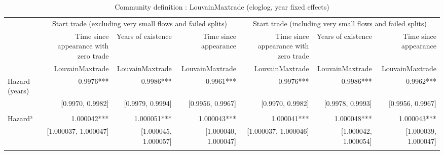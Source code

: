 \begin{table}[!h]
\caption{Community definition : LouvainMaxtrade (cloglog, year fixed effects)}
\centering
\begin{tabular}{lllllll}
\cline{1-7}
\multicolumn{1}{c}{} &
  \multicolumn{3}{|c}{Start trade (excluding very small flows and failed splits)} &
  \multicolumn{3}{c}{Start trade (including very small flows and failed splits)} \\
\multicolumn{1}{c}{} &
  \multicolumn{1}{|r}{Time since appearance with zero trade} &
  \multicolumn{1}{r}{Years of existence} &
  \multicolumn{1}{r}{Time since appearance} &
  \multicolumn{1}{r}{Time since appearance with zero trade} &
  \multicolumn{1}{r}{Years of existence} &
  \multicolumn{1}{r}{Time since appearance} \\
\multicolumn{1}{c}{} &
  \multicolumn{1}{|r}{LouvainMaxtrade} &
  \multicolumn{1}{r}{LouvainMaxtrade} &
  \multicolumn{1}{r}{LouvainMaxtrade} &
  \multicolumn{1}{r}{LouvainMaxtrade} &
  \multicolumn{1}{r}{LouvainMaxtrade} &
  \multicolumn{1}{r}{LouvainMaxtrade} \\
\cline{1-7}
\multicolumn{1}{l}{Hazard (years)} &
  \multicolumn{1}{|r}{0.9976***} &
  \multicolumn{1}{r}{0.9986***} &
  \multicolumn{1}{r}{0.9961***} &
  \multicolumn{1}{r}{0.9976***} &
  \multicolumn{1}{r}{0.9986***} &
  \multicolumn{1}{r}{0.9962***} \\
\multicolumn{1}{l}{} &
  \multicolumn{1}{|r}{[0.9970, 0.9982]} &
  \multicolumn{1}{r}{[0.9979, 0.9994]} &
  \multicolumn{1}{r}{[0.9956, 0.9967]} &
  \multicolumn{1}{r}{[0.9970, 0.9982]} &
  \multicolumn{1}{r}{[0.9978, 0.9993]} &
  \multicolumn{1}{r}{[0.9956, 0.9967]} \\
\multicolumn{1}{l}{} &
  \multicolumn{1}{|r}{} &
  \multicolumn{1}{r}{} &
  \multicolumn{1}{r}{} &
  \multicolumn{1}{r}{} &
  \multicolumn{1}{r}{} &
  \multicolumn{1}{r}{} \\
\multicolumn{1}{l}{Hazard²} &
  \multicolumn{1}{|r}{1.000042***} &
  \multicolumn{1}{r}{1.000051***} &
  \multicolumn{1}{r}{1.000043***} &
  \multicolumn{1}{r}{1.000041***} &
  \multicolumn{1}{r}{1.000048***} &
  \multicolumn{1}{r}{1.000043***} \\
\multicolumn{1}{l}{} &
  \multicolumn{1}{|r}{[1.000037, 1.000047]} &
  \multicolumn{1}{r}{[1.000045, 1.000057]} &
  \multicolumn{1}{r}{[1.000040, 1.000047]} &
  \multicolumn{1}{r}{[1.000037, 1.000046]} &
  \multicolumn{1}{r}{[1.000042, 1.000054]} &
  \multicolumn{1}{r}{[1.000039, 1.000047]} \\
\multicolumn{1}{l}{} &
  \multicolumn{1}{|r}{} &

\end{tabular}
\end{table}
